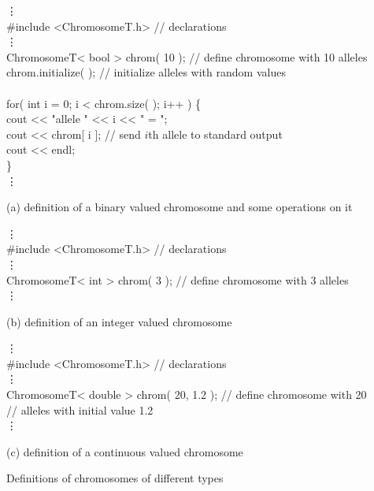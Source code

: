 \begin{example}[hb]
\begin{shortlisting}
            \vdots\\
\#include <ChromosomeT.h>         // {\rm declarations}\\
            \vdots\\
ChromosomeT< bool > chrom( 10 ); // {\rm define chromosome with 10 alleles\hspace*{-10cm}}\\
chrom.initialize( );             // {\rm initialize alleles with random values}\hspace*{-10cm}\\
\\
for( int i = 0; i < chrom.size( ); i++ ) \{\\
    cout << "allele " << i << " = ";\\
    cout << chrom[ i ];          // {\rm send $i$th allele to standard output\hspace*{-10cm}}\\
    cout << endl;\\
\}\\
            \vdots\\
\end{shortlisting}

(a) definition of a binary valued chromosome and some operations on it

\begin{shortlisting}
            \vdots\\
\#include <ChromosomeT.h>         // {\rm declarations}\\
            \vdots\\
ChromosomeT< int > chrom( 3 );   // {\rm define chromosome with 3 alleles\hspace*{-10cm}}\\
            \vdots\\
\end{shortlisting}

(b) definition of an integer valued chromosome

\begin{shortlisting}
            \vdots\\
\#include <ChromosomeT.h>        // {\rm declarations}\\
            \vdots\\
ChromosomeT< double > chrom( 20, 1.2 );  // {\rm define chromosome with 20\hspace*{-10cm}}\\
                                         // {\rm alleles with initial value 1.2\hspace*{-10cm}}\\
            \vdots\\
\end{shortlisting}

(c) definition of a continuous valued chromosome

\caption[Definitions of Chromosomes of Different Types]{
\label{datastruct:example:chrom-def}
Definitions of chromosomes of different types
}
\end{example}




